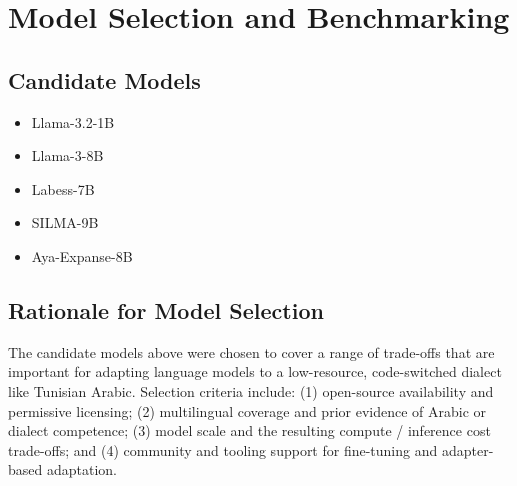 \documentclass[12pt,a4paper]{report}
\begin{document}
\section{Model Selection and Benchmarking}

\subsection{Candidate Models}

\begin{itemize}
    \item Llama-3.2-1B
    \item Llama-3-8B
    \item Labess-7B
    \item SILMA-9B
    \item Aya-Expanse-8B
\end{itemize}

\subsection{Rationale for Model Selection}

The candidate models above were chosen to cover a range of trade-offs that are important
for adapting language models to a low-resource, code-switched dialect like Tunisian Arabic.
Selection criteria include: (1) open-source availability and permissive licensing; (2)
multilingual coverage and prior evidence of Arabic or dialect competence; (3) model
scale and the resulting compute / inference cost trade-offs; and (4) community and tooling
support for fine-tuning and adapter-based adaptation.
\end{document}
